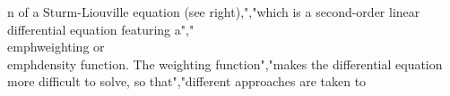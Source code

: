 {{{{{{{{{{n of a Sturm-Liouville equation (see right),","which is a second-order linear differential equation featuring a","\\emph{weighting} or \\emph{density} function. The weighting function","makes the differential equation more difficult to solve, so that","different approaches are taken to}}}}}}}}}}
